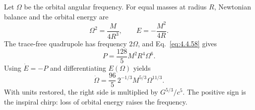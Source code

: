 \begin{enumerate}[leftmargin=2.8em,itemsep=1.2em]
Let \(\Omega\) be the orbital angular frequency.  For equal masses at radius
\(R\), Newtonian balance and the orbital energy are
\[
 \Omega^2=\frac{M}{4R^3},
 \qquad E=-\frac{M^2}{4R}.
\]
The trace-free quadrupole has frequency \(2\Omega\), and
Eq.~\eqref{eq:4.4.58} gives
\[
 P=\frac{128}{5}M^2R^4\Omega^6.
\]
Using \(\dot E=-P\) and differentiating \(E(\Omega)\) yields
\[
 \boxed{\dot\Omega
 =\frac{96}{5}\,2^{-1/3}M^{5/3}\Omega^{11/3}}.
\]
With units restored, the right side is multiplied by \(G^{5/3}/c^5\).
The positive sign is the inspiral chirp: loss of orbital energy raises the
frequency.
\end{enumerate}
